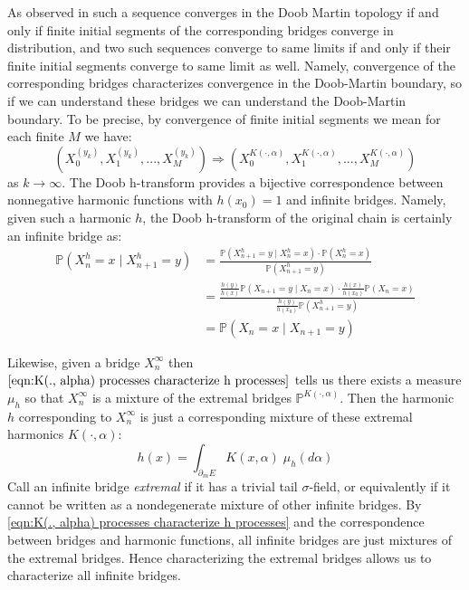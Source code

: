 \documentclass[11pt,oneside,reqno]{article}
\theoremstyle{plain}
\theoremstyle{definition}
\numberwithin{equation}{section}
\renewcommand{\cite}{\citet}
\renewcommand{\P}{\mathbb{P}}
\begin{document}
\noindent As observed in \cite{hans_bridges} such a sequence converges in the Doob Martin topology if and only if finite initial segments of the corresponding bridges converge in distribution, and two such sequences converge to same limits if and only if their finite initial segments converge to same limit as well. Namely, convergence of the corresponding bridges characterizes convergence in the Doob-Martin boundary, so if we can understand these bridges we can understand the Doob-Martin boundary. To be precise, by convergence of finite initial segments we mean for each finite $M$ we have: \\
%
\begin{equation}
    (X^{(y_k)}_0, X^{(y_k)}_1, ..., X^{(y_k)}_M) \Rightarrow (X^{K(\cdot, \alpha)}_0, X^{K(\cdot, \alpha)}_1, ..., X^{K(\cdot, \alpha)}_M)
    \label{eqn:2.3_initial_sections_finite_bridges}
\end{equation}
%
\noindent as $k \to \infty$. The Doob h-transform provides a bijective correspondence between nonnegative harmonic functions with $h(x_0) = 1$ and infinite bridges. Namely, given such a harmonic $h$, the Doob h-transform of the original chain is certainly an infinite bridge as:
%
\begin{align*}
  \P(X^h_n = x \; | \; X^h_{n+1} = y) & = \frac{\P(X^h_{n+1} = y \; | \; X^h_{n} = x) \cdot \P(X^h_n = x)}{\P(X^h_{n+1} = y)} \\
  & = \frac{\frac{h(y)}{h(x)}\P(X_{n+1} = y \; | \; X_{n} = x) \cdot \frac{h(x)}{h(x_0)}\P(X_n = x)}{\frac{h(y)}{h(x_0)}\P(X^h_{n+1} = y)} \\
  & = \P(X_n = x \; | \; X_{n+1} = y)
\end{align*}



\noindent Likewise, given a bridge $X^\infty_n$ then $\eqref{eqn:K(., alpha) processes characterize h processes}$ tells us there exists a measure $\mu_h$ so that $X^\infty_n$ is a mixture of the extremal bridges $\P^{K(\cdot, \alpha)}$. Then the harmonic $h$ corresponding to $X^\infty_n$ is just a corresponding mixture of these extremal harmonics $K(\cdot, \alpha)$:
%
\[h(x) = \int_{\partial_m E} K(x, \alpha) \; \mu_h(d \alpha)\]
%
\indent Call an infinite bridge \textit{extremal} if it has a trivial tail $\sigma$-field, or equivalently if it cannot be written as a nondegenerate mixture of other infinite bridges. By \eqref{eqn:K(., alpha) processes characterize h processes} and the correspondence between bridges and harmonic functions, all infinite bridges are just mixtures of the extremal bridges. Hence characterizing the extremal bridges allows us to characterize all infinite bridges.
\end{document}
